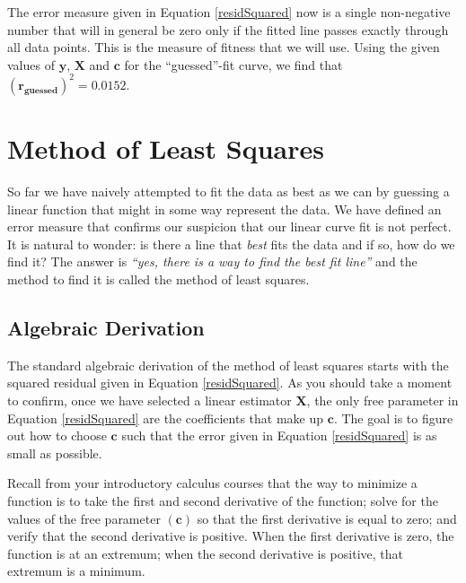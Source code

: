 The error measure given in Equation \ref{residSquared} now is a single
non-negative number that will in general be zero only if the fitted line passes exactly through all data points.  This is the measure of fitness that we will use.
Using the given values of $\mathbf{y}$, $\mathbf{X}$ and $\mathbf{c}$ for the
``guessed''-fit curve, we find that $\left(\mathbf{r_{\text{guessed}}}\right)^{2} = 0.0152.$ 

\section{Method of Least Squares}

So far we have naively attempted to fit the data as best as we can by guessing
a linear function that might in some way represent the data.  We have defined
an error measure that confirms our suspicion that our linear curve fit is not
perfect.  It is natural to wonder: is there a line that \emph{best} fits the
data and if so, how do we find it? The answer is \emph{``yes, there is a way to find the best fit line''} and the method to find it is called the method of least squares. 

\subsection{Algebraic Derivation}

The standard algebraic derivation of the method of least squares starts with the squared residual given in Equation \ref{residSquared}.  As you should take a moment to confirm, once we have selected a linear estimator $\mathbf{X}$, the only free parameter in Equation
\ref{residSquared} are the coefficients that make up $\mathbf{c}$.  The goal
is to figure out how to choose $\mathbf{c}$ such that the error given in
Equation \ref{residSquared} is as small as possible.

Recall from your introductory calculus courses that the way to minimize a
function is to take the first and second derivative of the function; solve for
the values of the free parameter $(\mathbf{c})$ so that the first derivative
is equal to zero; and verify that the second derivative is positive.  When the
first derivative is zero, the function is at an extremum; when the second
derivative is positive, that extremum is a minimum.

